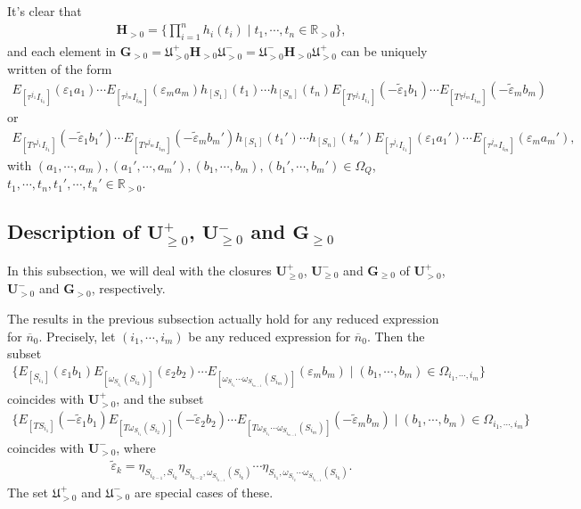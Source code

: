 \documentclass[12pt]{amsart}
\begin{document}
It's clear that
\begin{align*}
   \mathbf{H}_{>0}=\{ \prod_{i=1}^n h_i(t_i) \mid t_1,\cdots,t_n \in \mathbb{R}_{>0}  \}, 
\end{align*}
 and each element in $ \mathbf{G}_{>0}=\mathfrak{U}^+_{>0} \mathbf{H}_{>0} \mathfrak{U}^-_{>0}=\mathfrak{U}^-_{>0} \mathbf{H}_{>0} \mathfrak{U}^+_{>0}$ can be uniquely written of the form 
\begin{align*}
     E_{[\tau^{j_1}I_{i_1}]}(\varepsilon_1a_1)\cdots  E_{[\tau^{j_m}I_{i_m}]}(\varepsilon_ma_m) h_{[S_1]}(t_1)\cdots h_{[S_n]}(t_n)  E_{[T\tau^{j_1}I_{i_1}]}(-\tilde{\varepsilon}_1b_1)\cdots  E_{[T\tau^{j_m}I_{i_m}]}(-\tilde{\varepsilon}_mb_m)  
\end{align*}
or 
\begin{align*}
     E_{[T\tau^{j_1}I_{i_1}]}(-\tilde{\varepsilon}_1b_1')\cdots  E_{[T\tau^{j_m}I_{i_m}]}(-\tilde{\varepsilon}_mb_m')  h_{[S_1]}(t_1')\cdots h_{[S_n]}(t_n')   E_{[\tau^{j_1}I_{i_1}]}(\varepsilon_1a_1')\cdots  E_{[\tau^{j_m}I_{i_m}]}(\varepsilon_ma_m'),
\end{align*}
with $(a_1,\cdots,a_m),(a_1',\cdots,a_m'),(b_1,\cdots,b_m),(b_1',\cdots,b_m') \in \Omega_Q$, $t_1,\cdots,t_n,t_1',\cdots,t_n'\in\mathbb{R}_{>0}$.



\subsection{Description of $\mathbf{U}^+_{\geq 0}$, $\mathbf{U}^-_{\geq 0}$ and $\mathbf{G}_{\geq 0}$}
In this subsection, we will deal with the closures $\mathbf{U}^+_{\geq 0}$, $\mathbf{U}^-_{\geq 0}$ and $\mathbf{G}_{\geq 0}$ of $\mathbf{U}^+_{>0}$, $\mathbf{U}^-_{> 0}$ and $\mathbf{G}_{> 0}$, respectively.

The results in the previous subsection actually hold for any reduced expression for $\overline{n}_0$.
Precisely, let $(i_1,\cdots,i_m)$ be any reduced expression for $\overline{n}_0$.
Then the subset 
\begin{align*}
    \{ E_{[S_{i_1}]}(\varepsilon_1b_1) E_{[\omega_{S_{i_1}}(S_{i_2})]}(\varepsilon_2b_2)\cdots E_{[\omega_{S_{i_1}}\cdots\omega_{S_{i_{m-1}}}(S_{i_m})]}(\varepsilon_mb_m) \mid (b_1,\cdots,b_m)\in \Omega_{i_1,\cdots,i_m} \}
\end{align*}
coincides with $\mathbf{U}^+_{>0}$, and the subset 
\begin{align*}
    \{ E_{[TS_{i_1}]}(-\tilde{\varepsilon}_1b_1) E_{[T\omega_{S_{i_1}}(S_{i_2})]}(-\tilde{\varepsilon}_2b_2)\cdots E_{[T\omega_{S_{i_1}}\cdots\omega_{S_{i_{m-1}}}(S_{i_m})]}(-\tilde{\varepsilon}_mb_m) \mid (b_1,\cdots,b_m)\in \Omega_{i_1,\cdots,i_m} \}
\end{align*}
coincides with $\mathbf{U}^-_{>0}$, where 
\begin{align*}
    \tilde{\varepsilon}_k=\eta_{S_{i_{k-1}},S_{i_k}}\eta_{S_{i_{k-2}},\omega_{S_{i_{k-1}}}(S_{i_k})}\cdots \eta_{S_{i_1},\omega_{S_{i_2}}\cdots\omega_{S_{i_{k-1}}}(S_{i_k})}.
\end{align*}
The set $\mathfrak{U}^+_{>0}$ and $\mathfrak{U}^-_{>0}$ are special cases of these.
\end{document}
